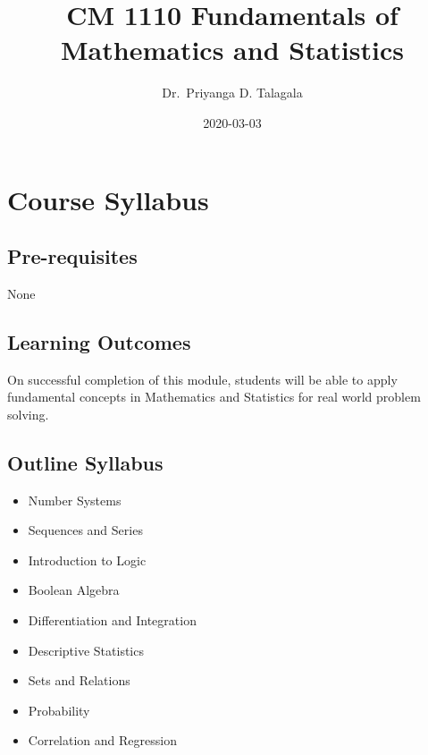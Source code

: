\documentclass[]{book}
\title{CM 1110 Fundamentals of Mathematics and Statistics}
\author{Dr.~Priyanga D. Talagala}
\date{2020-03-03}
\providecommand{\tightlist}{%
  \setlength{\itemsep}{0pt}\setlength{\parskip}{0pt}}
\begin{document}
\maketitle

{
\setcounter{tocdepth}{1}
\tableofcontents
}
\hypertarget{course-syllabus}{%
\chapter*{Course Syllabus}\label{course-syllabus}}

\hypertarget{pre-requisites}{%
\section*{Pre-requisites}\label{pre-requisites}}

None

\hypertarget{learning-outcomes}{%
\section*{Learning Outcomes}\label{learning-outcomes}}

On successful completion of this module, students will be able to apply fundamental concepts in Mathematics and Statistics for real world problem solving.

\hypertarget{outline-syllabus}{%
\section*{Outline Syllabus}\label{outline-syllabus}}

\begin{itemize}
\tightlist
\item
  Number Systems
\item
  Sequences and Series
\item
  Introduction to Logic
\item
  Boolean Algebra
\item
  Differentiation and Integration
\item
  Descriptive Statistics
\item
  Sets and Relations
\item
  Probability
\item
  Correlation and Regression
\end{itemize}
\end{document}
